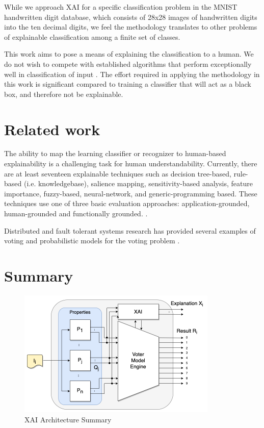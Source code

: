 \documentclass[conference]{IEEEtran}
\begin{document}
While we approach XAI for a specific classification problem in the MNIST handwritten digit database, which consists of 28x28 images of handwritten digits into the ten decimal digits, we feel the methodology translates to other problems of explainable classification among a finite set of classes.

This work aims to pose a means of explaining the classification to a human.  We do not wish to compete with established algorithms that perform exceptionally well in classification of input \cite{keysers07} \cite{lecun98} \cite{schm2012}.  The effort required in applying the methodology in this work is significant compared to training a classifier that will act as a black box, and therefore not be explainable.

\section{Related work}

The ability to map the learning classifier or recognizer to human-based explainability is a challenging task for human understandability.  Currently, there are at least seventeen explainable techniques such as
decision tree-based, rule-based (i.e. knowledgebase), salience mapping,
sensitivity-based analysis, feature importance, fuzzy-based, neural-network, and generic-programming based.  These techniques use one of three basic evaluation approaches: application-grounded, human-grounded and functionally grounded. \cite{BlackBox18} \cite{Survey18} \cite{Fuzzy19} \cite{Hagras18}  \cite{GP18}.

Distributed and fault tolerant systems research has provided several examples of voting \cite{avizienis} and probabilistic models for the voting problem \cite{blough}.

\section{Summary}

 \begin{figure}[htbp]
\centerline{\includegraphics[width=95mm]{./images/voting_prop_nn_2.png}}
\caption{XAI Architecture Summary}
\label{voting}
\end{figure}
\end{document}
